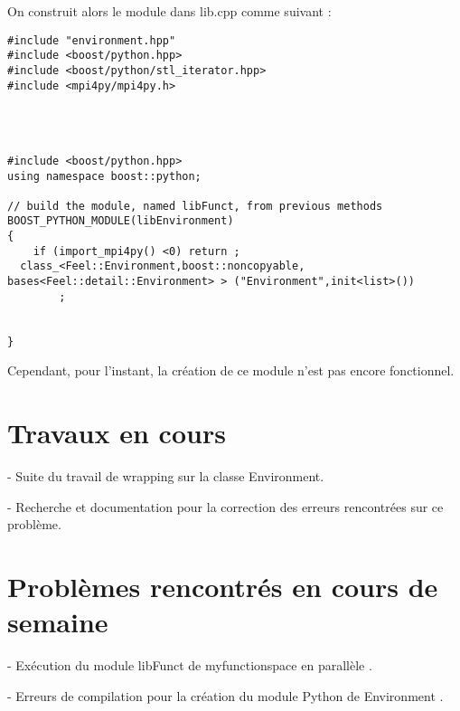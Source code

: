 \documentclass[12pt]{article}
\begin{document}
On construit alors le module dans lib.cpp comme suivant :

\begin{lstlisting}
#include "environment.hpp"
#include <boost/python.hpp>
#include <boost/python/stl_iterator.hpp>
#include <mpi4py/mpi4py.h>




#include <boost/python.hpp>
using namespace boost::python;

// build the module, named libFunct, from previous methods
BOOST_PYTHON_MODULE(libEnvironment)
{
    if (import_mpi4py() <0) return ;
  class_<Feel::Environment,boost::noncopyable, bases<Feel::detail::Environment> > ("Environment",init<list>())
        ;
       
     
}
\end{lstlisting}

Cependant, pour l'instant, la création de ce module n'est pas encore fonctionnel.


\section{Travaux en cours}
- Suite du travail de wrapping sur la classe Environment.

- Recherche et documentation pour la correction des erreurs rencontrées sur ce problème.

\section{Problèmes rencontrés en cours de semaine}
- Exécution du module libFunct de myfunctionspace en parallèle .

- Erreurs de compilation pour la création du module Python de Environment .
\end{document}
